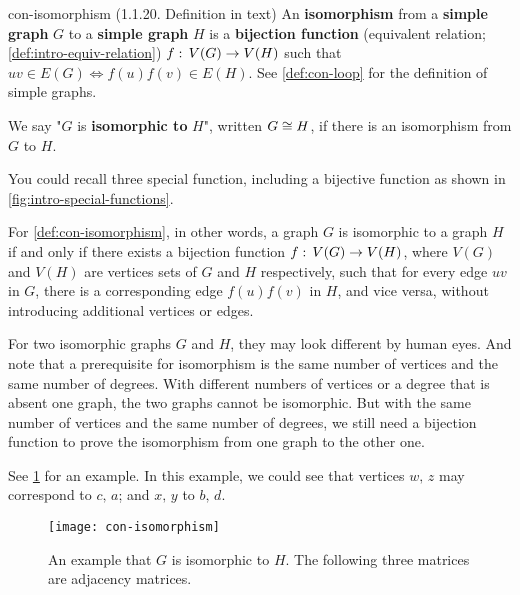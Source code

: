\documentclass[../src/handouts/main.tex]{subfiles}
\begin{document}
\begin{definition}{}{con-isomorphism}
  (1.1.20. Definition in text)
  An \textbf{isomorphism} from a \textbf{simple graph} $G$ to a \textbf{simple graph} $H$ is a \textbf{bijection function} (equivalent relation; \cref{def:intro-equiv-relation}) $f:\, V(G) \to V(H)$ such that $uv \in E(G) \iff f(u)f(v) \in E(H)$. See \cref{def:con-loop} for the definition of simple graphs.

  We say "$G$ is \textbf{isomorphic to} $H$", written $G \cong H$, if there is an isomorphism from $G$ to $H$.
\end{definition}

You could recall three special function, including a bijective function as shown in \cref{fig:intro-special-functions}.

For \cref{def:con-isomorphism}, in other words, a graph $G$ is isomorphic to a graph $H$ if and only if there exists a bijection function $f:\, V(G) \to V(H)$, where $V(G)$ and $V(H)$ are vertices sets of $G$ and $H$ respectively, such that for every edge $uv$ in $G$, there is a corresponding edge $f(u)f(v)$ in $H$, and vice versa, without introducing additional vertices or edges.

For two isomorphic graphs $G$ and $H$, they may look different by human eyes. And note that a prerequisite for isomorphism is the same number of vertices and the same number of degrees. With different numbers of vertices or a degree that is absent one graph, the two graphs cannot be isomorphic. But with the same number of vertices and the same number of degrees, we still need a bijection function to prove the isomorphism from one graph to the other one.

See \cref{fig:con-isomorphism} for an example. In this example, we could see that vertices $w,\, z$ may correspond to $c,\, a$; and $x,\, y$ to $b,\, d$.

\begin{figure}[htbp]
  \centering
  \texttt{[image: con-isomorphism]}
  \caption{An example that $G$ is isomorphic to $H$. The following three matrices are adjacency matrices.}
  \label{fig:con-isomorphism}
\end{figure}
\end{document}
